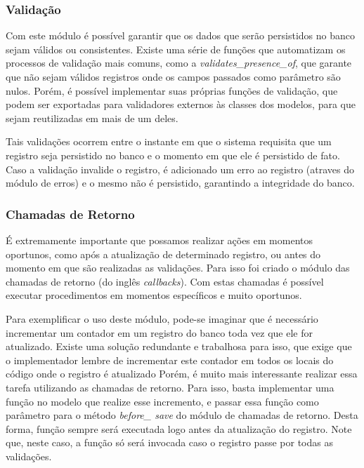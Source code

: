 \subsubsection{Validação}

Com este módulo é possível garantir que os dados que serão persistidos no banco sejam válidos ou consistentes. Existe uma série de funções que automatizam os processos de validação mais comuns, como a \textit{validates\_presence\_of}, que garante que não sejam válidos registros onde os campos passados como parâmetro são nulos. Porém, é possível implementar suas próprias funções de validação, que podem ser exportadas para validadores externos às classes dos modelos, para que sejam reutilizadas em mais de um deles.

Tais validações ocorrem entre o instante em que o sistema requisita que um registro seja persistido no banco e o momento em que ele é persistido de fato. Caso a validação invalide o registro, é adicionado um erro ao registro (atraves do módulo de erros) e o mesmo não é persistido, garantindo a integridade do banco.

\subsubsection{Chamadas de Retorno}

É extremamente importante que possamos realizar ações em momentos oportunos, como após a atualização de determinado registro, ou antes do momento em que são realizadas as validações. Para isso foi criado o módulo das chamadas de retorno (do inglês \textit{callbacks}). Com estas chamadas é possível executar procedimentos em momentos específicos e muito oportunos.

Para exemplificar o uso deste módulo, pode-se imaginar que é necessário incrementar um contador em um registro do banco toda vez que ele for atualizado. Existe uma solução redundante e trabalhosa para isso, que exige que o implementador lembre de incrementar este contador em todos os locais do código onde o registro é atualizado Porém, é muito mais interessante realizar essa tarefa utilizando as chamadas de retorno. Para isso, basta implementar uma função no modelo que realize esse incremento, e passar essa função como parâmetro para o método \textit{before\_ save} do módulo de chamadas de retorno. Desta forma, função sempre será executada logo antes da atualização do registro. Note que, neste caso, a função só será invocada caso o registro passe por todas as validações.


